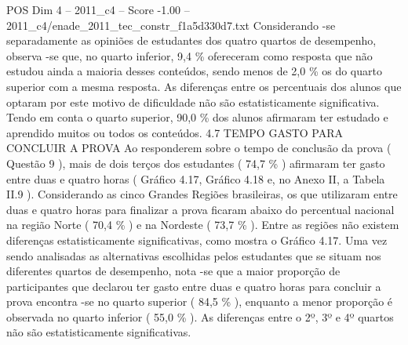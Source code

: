 \begin{textsample}{POS Dim 4 – 2011\_c4 – Score -1.00 – 2011\_c4/enade\_2011\_tec\_constr\_f1a5d330d7.txt}
Considerando -se separadamente as opiniões de estudantes dos quatro quartos de desempenho, observa -se que, no quarto inferior, 9,4 \% ofereceram como resposta que não estudou ainda a maioria desses conteúdos, sendo menos de 2,0 \% os do quarto superior com a mesma resposta.
As diferenças entre os percentuais dos alunos que optaram por este motivo de dificuldade não são estatisticamente significativa.
Tendo em conta o quarto superior, 90,0 \% dos alunos afirmaram ter estudado e aprendido muitos ou todos os conteúdos. 4.7 TEMPO GASTO PARA CONCLUIR A PROVA Ao responderem sobre o tempo de conclusão da prova ( Questão 9 ), mais de dois terços dos estudantes ( 74,7 \% ) afirmaram ter gasto entre duas e quatro horas ( Gráfico 4.17, Gráfico 4.18 e, no Anexo II, a Tabela II.9 ).
Considerando as cinco Grandes Regiões brasileiras, os que utilizaram entre duas e quatro horas para finalizar a prova ficaram abaixo do percentual nacional na região Norte ( 70,4 \% ) e na Nordeste ( 73,7 \% ).
Entre as regiões não existem diferenças estatisticamente significativas, como mostra o Gráfico 4.17.
Uma vez sendo analisadas as alternativas escolhidas pelos estudantes que se situam nos diferentes quartos de desempenho, nota -se que a maior proporção de participantes que declarou ter gasto entre duas e quatro horas para concluir a prova encontra -se no quarto superior ( 84,5 \% ), enquanto a menor proporção é observada no quarto inferior ( 55,0 \% ).
As diferenças entre o 2º, 3º e 4º quartos não são estatisticamente significativas.

\end{textsample}
